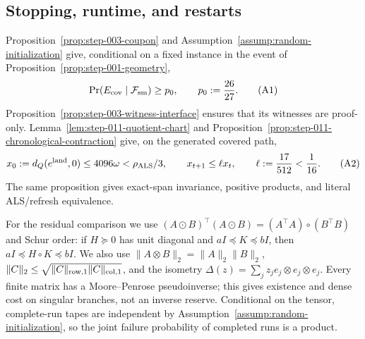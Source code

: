 \subsection{Stopping, runtime, and restarts}\label{app:step-012}

Proposition~\ref{prop:step-003-coupon} and
Assumption~\ref{assump:random-initialization} give, conditional on a fixed
instance in the event of Proposition~\ref{prop:step-001-geometry},
\[
\Pr(E_{\rm cov}\mid{\cal F}_{\rm sm})\ge p_0,
\qquad p_0:=\frac{26}{27}.
\tag{A1}
\]
Proposition~\ref{prop:step-003-witness-interface} ensures that its witnesses
are proof-only. Lemma~\ref{lem:step-011-quotient-chart} and
Proposition~\ref{prop:step-011-chronological-contraction} give, on the
generated covered path,
\[
x_0:=d_Q(e^{\rm land},0)\le4096\omega<\rho_{\rm ALS}/3,
\qquad x_{t+1}\le\ell x_t,\qquad
\ell:=\frac{17}{512}<\frac1{16}.
\tag{A2}
\]
The same proposition gives exact-span invariance, positive products, and
literal ALS/refresh equivalence.

For the residual comparison we use
$(A\odot B)^\top(A\odot B)=(A^\top A)\circ(B^\top B)$ and Schur order:
if $H\succeq0$ has unit diagonal and $aI\preceq K\preceq bI$, then
$aI\preceq H\circ K\preceq bI$. We also use
$\|A\otimes B\|_2=\|A\|_2\|B\|_2$,
$\|C\|_2\le\sqrt{\|C\|_{\rm row,1}\|C\|_{\rm col,1}}$, and the isometry
$\Delta(z)=\sum_jz_je_j\otimes e_j\otimes e_j$. Every finite matrix has a
Moore--Penrose pseudoinverse; this gives existence and dense cost on singular
branches, not an inverse reserve. Conditional on the tensor, complete-run
tapes are independent by Assumption~\ref{assump:random-initialization}, so the
joint failure probability of completed runs is a product.

